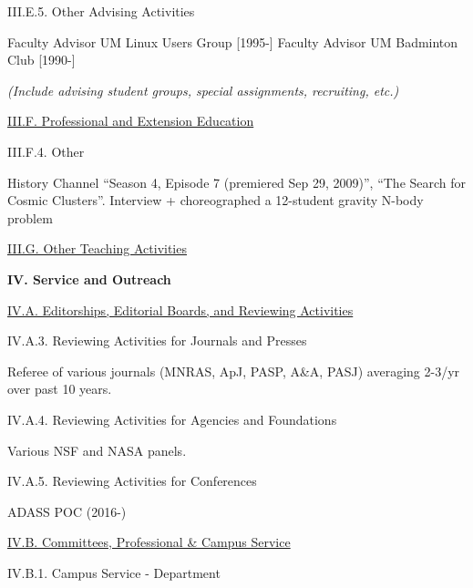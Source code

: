 \documentclass[11pt,letterpaper]{article}
\newcommand{\newi}{\newline\indent}
\begin{document}




III.E.5. Other Advising Activities

Faculty Advisor UM Linux Users Group [1995-]\newi
Faculty Advisor UM Badminton Club [1990-]\newi

\textit{(Include advising student groups, special assignments, recruiting, etc.)}


\underline{III.F. Professional and Extension Education}




III.F.4. Other

History Channel ``Season 4, Episode 7 (premiered Sep 29, 2009)'',
``The Search for Cosmic Clusters''. Interview + choreographed a 12-student gravity N-body problem



\underline{III.G. Other Teaching Activities}


\textbf{IV. Service and Outreach}


\underline{IV.A. Editorships, Editorial Boards, and Reviewing Activities}




IV.A.3. Reviewing Activities for Journals and Presses

Referee of various journals (MNRAS, ApJ, PASP, A\&A, PASJ) averaging 2-3/yr over past 10 years.


IV.A.4. Reviewing Activities for Agencies and Foundations

Various NSF and NASA panels.

IV.A.5. Reviewing Activities for Conferences

ADASS POC (2016-)




\underline{IV.B. Committees, Professional \& Campus Service}

IV.B.1. Campus Service - Department
\end{document}
